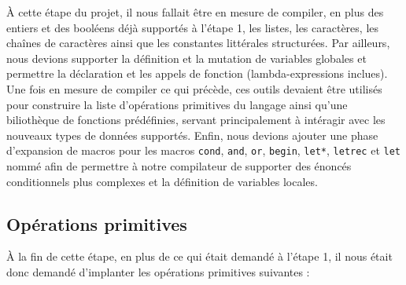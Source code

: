 \documentclass[12pt]{article}
\begin{document}
À cette étape du projet, il nous fallait être en mesure de compiler, en plus des entiers et des booléens déjà supportés à l'étape 1, les listes, les caractères, les chaînes de caractères ainsi que les constantes littérales structurées. Par ailleurs, nous devions supporter la définition et la mutation de variables globales et permettre la déclaration et les appels de fonction (lambda-expressions inclues). Une fois en mesure de compiler ce qui précède, ces outils devaient être utilisés pour construire la liste d'opérations primitives du langage ainsi qu'une biliothèque de fonctions prédéfinies, servant principalement à intéragir avec les nouveaux types de données supportés. Enfin, nous devions ajouter une phase d'expansion de macros pour les macros \texttt{cond}, \texttt{and}, \texttt{or}, \texttt{begin}, \texttt{let*}, \texttt{letrec} et \texttt{let} nommé afin de permettre à notre compilateur de supporter des énoncés conditionnels plus complexes et la définition de variables locales.

\subsection{Opérations primitives}

À la fin de cette étape, en plus de ce qui était demandé à l'étape 1, il nous était donc demandé d'implanter les opérations primitives suivantes :
\end{document}
